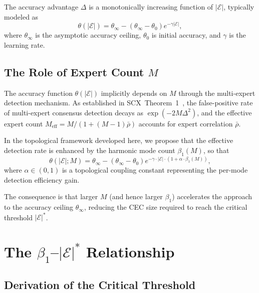 \documentclass[12pt,a4paper]{article}
\theoremstyle{definition}
\theoremstyle{remark}
\theoremstyle{definition}
\newcommand{\CEC}{\mathcal{E}}
\newcommand{\SCX}{\textsf{SCX}}
\newcommand{\CECstar}{|\CEC|^*}
\begin{document}
The accuracy advantage $\Delta$ is a monotonically increasing function of $|\CEC|$, typically modeled as
\begin{equation}\label{eq:theta_cec}
  \theta(|\CEC|) = \theta_\infty - (\theta_\infty - \theta_0) e^{-\gamma |\CEC|},
\end{equation}
where $\theta_\infty$ is the asymptotic accuracy ceiling, $\theta_0$ is initial accuracy, and $\gamma$ is the learning rate.

\subsection{The Role of Expert Count $M$}

The accuracy function $\theta(|\CEC|)$ implicitly depends on $M$ through the multi-expert detection mechanism. As established in \SCX\ Theorem~1~\cite{scx_theory}, the false-positive rate of multi-expert consensus detection decays as $\exp(-2M\Delta^2)$, and the effective expert count $M_{\text{eff}} = M/(1+(M-1)\bar{\rho})$ accounts for expert correlation $\bar{\rho}$.

In the topological framework developed here, we propose that the effective detection rate is enhanced by the harmonic mode count $\beta_1(M)$, so that
\begin{equation}\label{eq:theta_enhanced}
  \theta(|\CEC|; M) = \theta_\infty - (\theta_\infty - \theta_0) e^{-\gamma \cdot |\CEC| \cdot (1 + \alpha \cdot \beta_1(M))},
\end{equation}
where $\alpha \in (0,1)$ is a topological coupling constant representing the per-mode detection efficiency gain.

The consequence is that larger $M$ (and hence larger $\beta_1$) accelerates the approach to the accuracy ceiling $\theta_\infty$, reducing the CEC size required to reach the critical threshold $\CECstar$.

\section{The \texorpdfstring{$\beta_1$--$\CECstar$}{β₁--|ℰ|*} Relationship}

\subsection{Derivation of the Critical Threshold}
\end{document}
